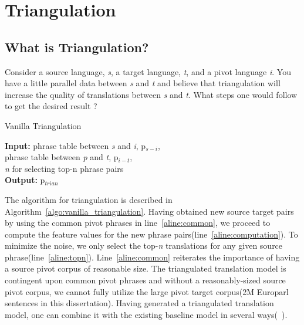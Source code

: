 \chapter{Triangulation}
\label{chap:triangulation}


\section{What is Triangulation?}
\label{sec:triangulation}

Consider a source language, \emph{s}, a target language, \emph{t}, and a pivot language \emph{i}. You have a little parallel data between \emph{s} and \emph{t} and believe that triangulation will increase the quality of translations between \emph{s} and \emph{t}. What steps one would follow to get the desired result ?

\begin{algorithm}
\caption{Vanilla Triangulation}
\label{algo:vanilla_triangulation}

\textbf{Input:} phrase table between \emph{s} and \emph{i}, p$_{s-i}$, \\
 phrase table between \emph{p} and \emph{t}, p$_{i-t}$,  \\
 \emph{n} for selecting top-n phrase pairs \\
\textbf{Output:} p$_{trian}$
\begin{algorithmic}[l]
 \label{aline:common}

         \label{aline:computation}
        \ENDFOR
         \label{aline:topn}
        \ENDIF
        \ENDFOR


\end{algorithmic}

\end{algorithm}

The algorithm for triangulation is described in Algorithm~\ref{algo:vanilla_triangulation}. Having obtained new source target pairs by using the common pivot phrases in line~\ref{aline:common}, we proceed to compute the feature values for the new phrase pairs(line~\ref{aline:computation}). To minimize the noise, we only select the top-\emph{n} translations for any given source phrase(line~\ref{aline:topn}). Line~\ref{aline:common} reiterates the importance of having a source pivot corpus of reasonable size. The triangulated translation model is contingent upon common pivot phrases and without a reasonably-sized source pivot corpus, we cannot fully utilize the large pivot target corpus(2M Europarl sentences in this dissertation). Having generated a triangulated translation model, one can combine it with the existing baseline model in several ways(~\cite{Bertoldi:08, Nakov:12, Cohn:07}). 

